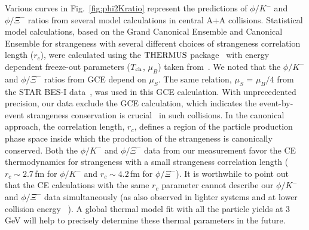 \documentclass[%
 reprint,	
showpacs,
 amsmath,amssymb,
 aps,
 superscriptaddress,
]{revtex4-1}
\begin{document}
Various curves in Fig.~\ref{fig:phi2Kratio} represent the predictions of $\phi/K^-$ and $\phi/\Xi^-$ ratios from several model calculations in central A+A collisions. Statistical model calculations, based on the Grand Canonical Ensemble and Canonical Ensemble for strangeness with several different choices of strangeness correlation length ($r_c$), were calculated using the $\textup{THERMUS}$ package~\cite{THERMUS_WHEATON200984} with energy dependent freeze-out parameters ($T_{\rm ch}$, $\mu_B$) taken from~\cite{Andronic_2018Naure}. %
We noted that the $\phi/K^-$ and $\phi/\Xi^-$ ratios from GCE depend on $\mu_{S}$. The same relation, $\mu_{S}$ = $\mu_{B}/4$ from the STAR BES-I data~\cite{star_bes_strangeness}, was used in this GCE calculation. 
With unprecedented precision, our data exclude the GCE calculation, %
which indicates the event-by-event strangeness conservation %
is crucial~\cite{BraunMunzinger:2003zd} in such collisions. In the canonical approach, the correlation length, $r_c$, defines a region of the particle production phase space inside which the production of the strangeness is canonically conserved. Both the $\phi/K^-$ and $\phi/\Xi^-$ data from our measurement favor the CE thermodynamics for strangeness with a small strangeness correlation length ($r_c \sim 2.7$\,fm for $\phi/K^-$ and $r_c \sim 4.2$\,fm for $\phi/\Xi^-$). It is worthwhile to point out that the CE calculations with the same $r_c$ parameter cannot describe our $\phi/K^-$ and $\phi/\Xi^-$ data simultaneously (as also observed in lighter systems and at lower collision energy ~\cite{HADES_phi_ArKCl}). %
A global thermal model fit with all the particle yields at 3\,GeV will help to precisely determine these thermal parameters in the future.
\end{document}
